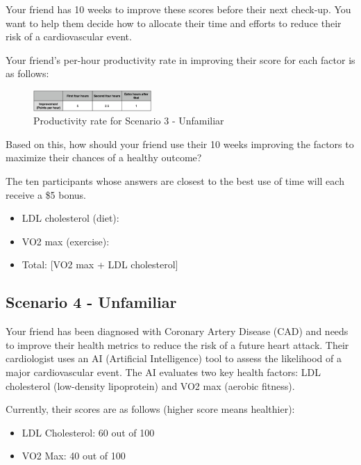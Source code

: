 Your friend has 10 weeks to improve these scores before their next check-up. You want to help them decide how to allocate their time and efforts to reduce their risk of a cardiovascular event.

Your friend’s per-hour productivity rate in improving their score for each factor is as follows:

\begin{figure}[ht]
    \centering
    \includegraphics[width=0.4\textwidth]{Figures/rate-unf.png}
    \caption{Productivity rate for Scenario 3 - Unfamiliar}
    \label{fig:survey-cost-scenario3-unf}
\end{figure}

Based on this, how should your friend use their 10 weeks improving the factors to maximize their chances of a healthy outcome?

The ten participants whose answers are closest to the best use of time will each receive a \$5 bonus. 

\begin{itemize}
    \item LDL cholesterol (diet): \underline{\hspace{3cm}}
    \item VO2 max (exercise): \underline{\hspace{3cm}}
    \item Total: [VO2 max + LDL cholesterol]
\end{itemize}

\subsection{Scenario 4 - Unfamiliar}
Your friend has been diagnosed with Coronary Artery Disease (CAD) and needs to improve their health metrics to reduce the risk of a future heart attack. Their cardiologist uses an AI (Artificial Intelligence) tool to assess the likelihood of a major cardiovascular event. The AI evaluates two key health factors: LDL cholesterol (low-density lipoprotein) and VO2 max (aerobic fitness).

Currently, their scores are as follows (higher score means healthier):
\begin{itemize}
    \item LDL Cholesterol: 60 out of 100
    \item VO2 Max: 40 out of 100
\end{itemize}

